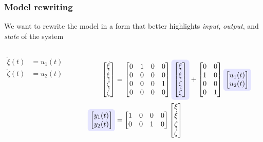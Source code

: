 \begin{frame} 
    \frametitle{Model rewriting}
	We want to rewrite the model in a form that better highlights \emph{input}, \emph{output}, and \emph{state} of the system
    \begin{columns}[onlytextwidth]
        \begin{align*}
        \ddot{\xi}(t)& = u_1(t) \\
        \ddot{\zeta}(t)& = u_2(t)
        \end{align*}
        \vspace*{2em}
        \begin{center}
        \end{center}
        \vspace*{1em}
        \begin{align*}
        \mat{\dot{\xi}\\\ddot{\xi}\\\dot{\zeta}\\\ddot{\zeta}} 
        &=
        \mat{0&1&0&0\\0&0&0&0\\0&0&0&1\\0&0&0&0}
        \tikz[baseline]{
            \node[fill=blue!10,anchor=base,rounded corners] (state)
            {$\mat{{\xi}\\\dot{\xi}\\{\zeta}\\\dot{\zeta}}$};
        }
        + 
        \mat{0&0\\1 &0\\0&0 \\0&1} 
        \tikz[baseline]{
            \node[fill=blue!10,anchor=base,rounded corners] (input)
            {$\mat{u_1(t)\\u_2(t)}$};
        }\\
        \tikz[baseline]{
            \node[fill=blue!10,anchor=base,rounded corners] (output)
            {$\mat{y_1(t)\\y_2(t)}$};
        }
        &=\mat{1&0&0&0\\0&0&1&0}\mat{\xi\\\dot{\xi}\\{\zeta}\\\dot{\zeta}}
        \end{align*}
        

\end{columns}
\end{frame}
